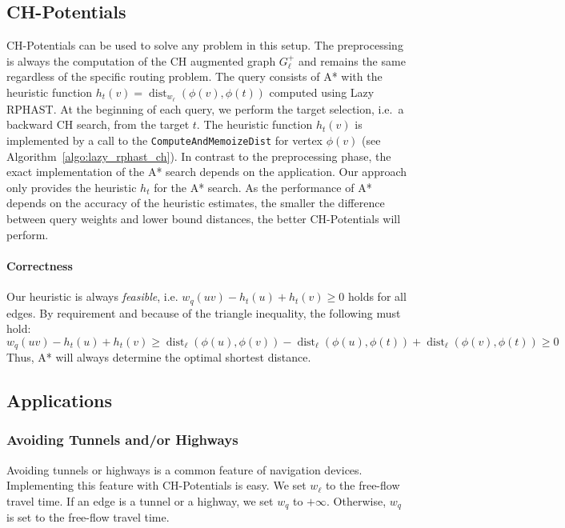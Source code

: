 \documentclass[manuscript]{acmart}
\newcommand*{\dist}{\operatorname{dist}}
\begin{document}
\subsection{CH-Potentials}\label{sec:chpot}
CH-Potentials can be used to solve any problem in this setup.
The preprocessing is always the computation of the CH augmented graph $G^+_{\ell}$ and remains the same regardless of the specific routing problem.
The query consists of A* with the heuristic function $h_t(v) = \dist_{w_{\ell}}(\phi(v), \phi(t))$ computed using Lazy RPHAST.
At the beginning of each query, we perform the target selection, i.e.\ a backward CH search, from the target $t$.
The heuristic function $h_t(v)$ is implemented by a call to the \texttt{ComputeAndMemoizeDist} for vertex $\phi(v)$ (see Algorithm~\ref{algo:lazy_rphast_ch}).
In contrast to the preprocessing phase, the exact implementation of the A* search depends on the application.
Our approach only provides the heuristic $h_t$ for the A* search.
As the performance of A* depends on the accuracy of the heuristic estimates, the smaller the difference between query weights and lower bound distances, the better CH-Potentials will perform.

\paragraph{Correctness}
Our heuristic is always \emph{feasible}, i.e. $w_q(u v) - h_t(u) + h_t(v) \geq 0$ holds for all edges.
By requirement and because of the triangle inequality, the following must hold:
\[
w_q(u v) - h_t(u) + h_t(v) \geq \dist_\ell(\phi(u), \phi(v)) - \dist_\ell(\phi(u), \phi(t)) + \dist_\ell(\phi(v), \phi(t)) \geq 0
\]
Thus, A* will always determine the optimal shortest distance.

\subsection{Applications}\label{sec:applications}
\subsubsection{Avoiding Tunnels and/or Highways}
\label{sec:no-tunnel-highway}

Avoiding tunnels or highways is a common feature of navigation devices.
Implementing this feature with CH-Potentials is easy.
We set $w_\ell$ to the free-flow travel time.
If an edge is a tunnel or a highway, we set $w_q$ to $+\infty$.
Otherwise, $w_q$ is set to the free-flow travel time.
\end{document}
